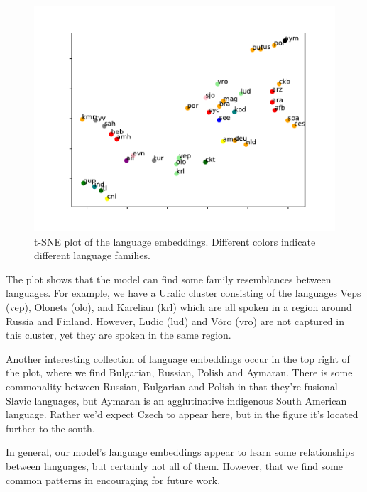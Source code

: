 \documentclass[11pt,a4paper]{article}
\begin{document}
\begin{figure}[ht]
\centering
\includegraphics[scale=0.5]{lang_tsne.pdf}
\caption{\label{fig:lang_tsne} t-SNE plot of the language
embeddings. Different colors indicate different language families.}
\end{figure}

The plot shows that the model can find some family resemblances
between languages. For example, we have a Uralic cluster consisting of
the languages Veps (vep), Olonets (olo), and Karelian (krl) which are
all spoken in a region around Russia and Finland. However, Ludic (lud)
and V\~{o}ro (vro) are not captured in this cluster, yet they are
spoken in the same region.

Another interesting collection of language embeddings occur in the top
right of the plot, where we find Bulgarian, Russian, Polish and
Aymaran. There is some commonality between Russian, Bulgarian and
Polish in that they're fusional Slavic languages, but Aymaran is an
agglutinative indigenous South American language. Rather we'd expect
Czech to appear here, but in the figure it's located further to the
south. 

In general, our model's language embeddings appear to learn some
relationships between languages, but certainly not all of
them. However, that we find some common patterns in encouraging for
future work.

\end{document}
